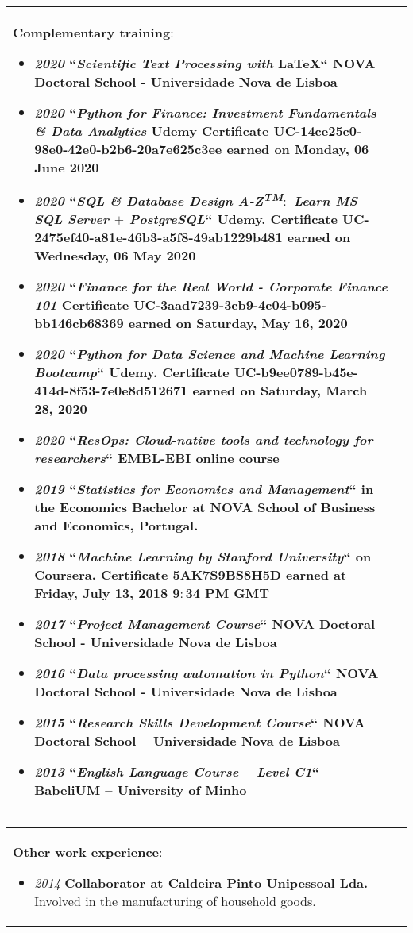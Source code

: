 \documentclass[a4paper,11pt]{article}
\begin{document}
\begin{center}
\begin{tabularx}{\linewidth}{XX}
\textbf{Complementary training$\colon$}
\begin{itemize}
\item \emph{2020} ``\emph{\textbf{Scientific Text Processing with}} \LaTeX`` NOVA Doctoral School - Universidade Nova de Lisboa
\item \emph{2020} ``\emph{\textbf{Python for Finance: Investment Fundamentals \& Data Analytics}} Udemy Certificate UC-14ce25c0-98e0-42e0-b2b6-20a7e625c3ee earned on Monday, 06 June 2020
\item \emph{2020} ``\emph{\textbf {SQL \& Database Design A-Z\textsuperscript{TM}$\colon$ Learn MS SQL Server $+$ PostgreSQL}}`` Udemy. Certificate UC-2475ef40-a81e-46b3-a5f8-49ab1229b481 earned on Wednesday, 06 May 2020
\item \emph{2020} ``\emph{\textbf{Finance for the Real World - Corporate Finance 101}} Certificate UC-3aad7239-3cb9-4c04-b095-bb146cb68369 earned on Saturday, May 16, 2020
\item \emph{2020} ``\emph{\textbf {Python for Data Science and Machine Learning Bootcamp}}`` Udemy. Certificate UC-b9ee0789-b45e-414d-8f53-7e0e8d512671 earned on Saturday, March 28, 2020
\item \emph{2020} ``\emph{\textbf {ResOps: Cloud-native tools and technology for researchers}}`` EMBL-EBI online course
\item \emph{2019} ``\emph{\textbf {Statistics for Economics and Management}}`` in the Economics Bachelor at NOVA School of Business and Economics, Portugal.
\item \emph{2018} ``\emph{\textbf {Machine Learning by Stanford University}}`` on Coursera. Certificate 5AK7S9BS8H5D earned at Friday, July 13, 2018 9$\colon$34 PM GMT
\item \emph{2017} ``\emph{\textbf {Project Management Course}}``  NOVA Doctoral School - Universidade Nova de Lisboa
\item \emph{2016} ``\emph{\textbf {Data processing automation in Python}}``  NOVA Doctoral School - Universidade Nova de Lisboa
\item \emph{2015} ``\emph{\textbf {Research Skills Development Course}}`` NOVA Doctoral School – Universidade Nova de Lisboa
\item \emph{2013} ``\emph{\textbf {English Language Course – Level C1}}`` BabeliUM – University of Minho
\end{itemize} \\
\bottomrule[1pt]
\end{tabularx}

\begin{tabularx}{\linewidth}{X}
\textbf{Other work experience$\colon$}
\begin{itemize}
\item \textit{2014} \textbf{Collaborator at Caldeira Pinto Unipessoal Lda.} - Involved in the manufacturing of household goods.
\end{itemize}
\end{tabularx}

\end{center}
\thispagestyle{empty} 
\end{document}
